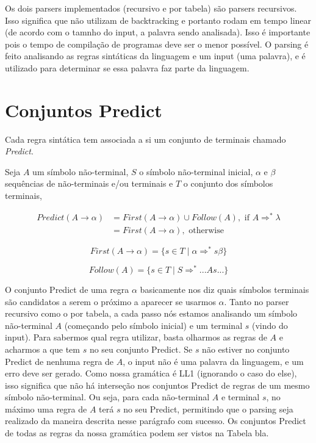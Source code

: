 Os dois parsers implementados (recursivo e por tabela) são parsers recursivos. Isso significa que não utilizam de backtracking e portanto rodam em tempo linear (de acordo com o tamnho do input, a palavra sendo analisada). Isso é importante pois o tempo de compilação de programas deve ser o menor possível. O parsing é feito analisando as regras sintáticas da linguagem e um input (uma palavra), e é utilizado para determinar se essa palavra faz parte da linguagem. 

\section{Conjuntos Predict}
Cada regra sintática tem associada a si um conjunto de terminais chamado \textit{Predict}.

Seja $A$ um símbolo não-terminal, $S$ o símbolo não-terminal inicial, $\alpha$ e $\beta$ sequências de não-terminais e/ou terminais e $T$ o conjunto dos símbolos terminais,

\begin{equation}
\begin{split}
Predict(A \rightarrow \alpha) & = First(A\rightarrow \alpha) \cup Follow(A), \text{ if } A \Rightarrow^* \lambda \\
 & = First(A\rightarrow \alpha), \text{ otherwise}
\end{split}
\end{equation}

\begin{equation}
First(A \rightarrow \alpha) = \{s \in T \mid \alpha \Rightarrow^* s\beta\}
\end{equation}

\begin{equation}
Follow(A) = \{s \in T \mid S \Rightarrow^* ...As...\}
\end{equation}

O conjunto Predict de uma regra $\alpha$ basicamente nos diz quais símbolos terminais são candidatos a serem o próximo a aparecer se usarmos $\alpha$. Tanto no parser recursivo como o por tabela, a cada passo nós estamos analisando um símbolo não-terminal $A$ (começando pelo símbolo inicial) e um terminal $s$ (vindo do input). Para sabermos qual regra utilizar, basta olharmos as regras de $A$ e acharmos a que tem $s$ no seu conjunto Predict. Se $s$ não estiver no conjunto Predict de nenhuma regra de $A$, o input não é uma palavra da linguagem, e um erro deve ser gerado. Como nossa gramática é LL1 (ignorando o caso do else), isso significa que não há interseção nos conjuntos Predict de regras de um mesmo símbolo não-terminal. Ou seja, para cada não-terminal $A$ e terminal $s$, no máximo uma regra de $A$ terá $s$ no seu Predict, permitindo que o parsing seja realizado da maneira descrita nesse parágrafo com sucesso. Os conjuntos Predict de todas as regras da nossa gramática podem ser vistos na Tabela bla.

